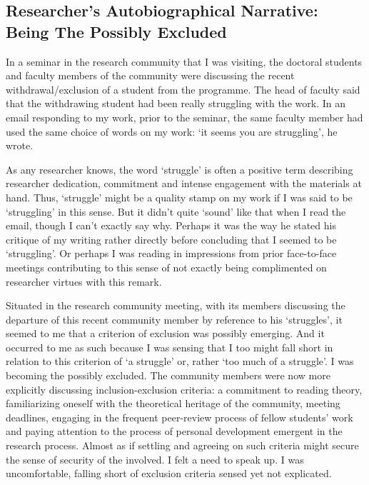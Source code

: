 \subsection{Researcher’s Autobiographical Narrative: Being The Possibly Excluded}
In a seminar in the research community that I was visiting, the doctoral students and faculty members of the community were discussing the recent withdrawal/exclusion of a student from the programme. The head of faculty said that the withdrawing student had been really struggling with the work. In an email responding to my work, prior to the seminar, the same faculty member had used the same choice of words on my work: ‘it seems you are struggling’, he wrote. 

As any researcher knows, the word ‘struggle’ is often a positive term describing researcher dedication, commitment and intense engagement with the materials at hand. Thus, ‘struggle’ might be a quality stamp on my work if I was said to be ‘struggling’ in this sense. But it didn’t quite ‘sound’ like that when I read the email, though I can’t exactly say why. Perhaps it was the way he stated his critique of my writing rather directly before concluding that I seemed to be ‘struggling’. Or perhaps I was reading in impressions from prior face-to-face meetings contributing to this sense of not exactly being complimented on researcher virtues with this remark. 

Situated in the research community meeting, with its members discussing the departure of this recent community member by reference to his ‘struggles’, it seemed to me that a criterion of exclusion was possibly emerging. And it occurred to me as such because I was sensing that I too might fall short in relation to this criterion of ‘a struggle’ or, rather ‘too much of a struggle’. I was becoming the possibly excluded. The community members were now more explicitly discussing inclusion-exclusion criteria: a commitment to reading theory, familiarizing oneself with the theoretical heritage of the community, meeting deadlines, engaging in the frequent peer-review process of fellow students’ work and paying attention to the process of personal development emergent in the research process. Almost as if settling and agreeing on such criteria might secure the sense of security of the involved. I felt a need to speak up. I was uncomfortable, falling short of exclusion criteria sensed yet not explicated. 


